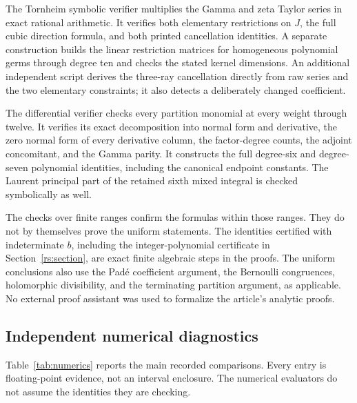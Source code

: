 \documentclass[11pt,a4paper]{article}
\numberwithin{equation}{section}
\theoremstyle{plain}
\theoremstyle{definition}
\theoremstyle{remark}
\begin{document}
The Tornheim symbolic verifier multiplies the Gamma and zeta Taylor
series in exact rational arithmetic. It verifies both elementary
restrictions on $J$, the full cubic direction formula, and both printed
cancellation identities. A separate construction builds the linear
restriction matrices for homogeneous polynomial germs through degree ten
and checks the stated kernel dimensions. An additional independent script
derives the three-ray cancellation directly from raw series and the two
elementary constraints; it also detects a deliberately changed coefficient.

The differential verifier checks every partition monomial at every
weight through twelve. It verifies its exact decomposition into normal
form and derivative, the zero normal form of every derivative column,
the factor-degree counts, the adjoint concomitant, and the Gamma parity.
It constructs the full degree-six and degree-seven polynomial identities,
including the canonical endpoint constants. The Laurent principal part
of the retained sixth mixed integral is checked symbolically as well.

The checks over finite ranges confirm the formulas within those
ranges. They do not by themselves prove the uniform statements.
The identities certified with indeterminate $b$, including the
integer-polynomial certificate in Section~\ref{rs:section}, are exact
finite algebraic steps in the proofs. The uniform conclusions also
use the Pad\'e coefficient argument, the Bernoulli congruences,
holomorphic divisibility, and the terminating partition argument,
as applicable. No external proof assistant was used to formalize
the article's analytic proofs.

\subsection{Independent numerical diagnostics}

Table~\ref{tab:numerics} reports the main recorded comparisons. Every
entry is floating-point evidence, not an interval enclosure. The numerical
evaluators do not assume the identities they are checking.
\end{document}

